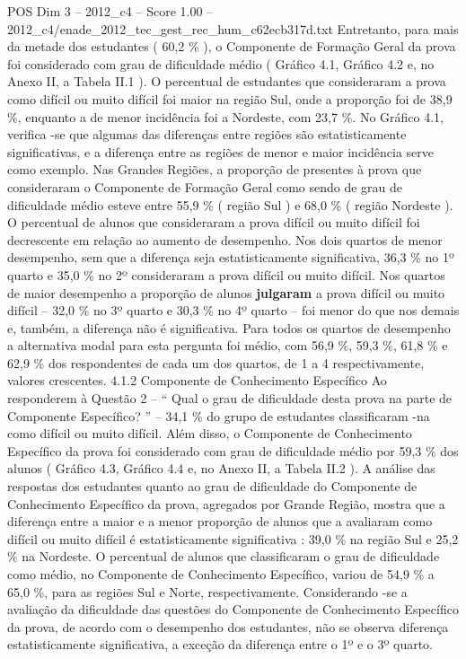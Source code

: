 \begin{textsample}{POS Dim 3 – 2012\_c4 – Score 1.00 – 2012\_c4/enade\_2012\_tec\_gest\_rec\_hum\_c62ecb317d.txt}
Entretanto, para mais da metade dos estudantes ( 60,2 \% ), o Componente de Formação Geral da prova foi considerado com grau de dificuldade médio ( Gráfico 4.1, Gráfico 4.2 e, no Anexo II, a Tabela II.1 ).
O percentual de estudantes que consideraram a prova como difícil ou muito difícil foi maior na região Sul, onde a proporção foi de 38,9 \%, enquanto a de menor incidência foi a Nordeste, com 23,7 \%.
No Gráfico 4.1, verifica -se que algumas das diferenças entre regiões são estatisticamente significativas, e a diferença entre as regiões de menor e maior incidência serve como exemplo.
Nas Grandes Regiões, a proporção de presentes à prova que consideraram o Componente de Formação Geral como sendo de grau de dificuldade médio esteve entre 55,9 \% ( região Sul ) e 68,0 \% ( região Nordeste ).
O percentual de alunos que consideraram a prova difícil ou muito difícil foi decrescente em relação ao aumento de desempenho.
Nos dois quartos de menor desempenho, sem que a diferença seja estatisticamente significativa, 36,3 \% no 1º quarto e 35,0 \% no 2º consideraram a prova difícil ou muito difícil.
Nos quartos de maior desempenho a proporção de alunos \textbf{julgaram} a prova difícil ou muito difícil – 32,0 \% no 3º quarto e 30,3 \% no 4º quarto – foi menor do que nos demais e, também, a diferença não é significativa.
Para todos os quartos de desempenho a alternativa modal para esta pergunta foi médio, com 56,9 \%, 59,3 \%, 61,8 \% e 62,9 \% dos respondentes de cada um dos quartos, de 1 a 4 respectivamente, valores crescentes. 4.1.2 Componente de Conhecimento Específico Ao responderem à Questão 2 – “ Qual o grau de dificuldade desta prova na parte de Componente Específico? ” – 34,1 \% do grupo de estudantes classificaram -na como difícil ou muito difícil.
Além disso, o Componente de Conhecimento Específico da prova foi considerado com grau de dificuldade médio por 59,3 \% dos alunos ( Gráfico 4.3, Gráfico 4.4 e, no Anexo II, a Tabela II.2 ).
A análise das respostas dos estudantes quanto ao grau de dificuldade do Componente de Conhecimento Específico da prova, agregados por Grande Região, mostra que a diferença entre a maior e a menor proporção de alunos que a avaliaram como difícil ou muito difícil é estatisticamente significativa : 39,0 \% na região Sul e 25,2 \% na Nordeste.
O percentual de alunos que classificaram o grau de dificuldade como médio, no Componente de Conhecimento Específico, variou de 54,9 \% a 65,0 \%, para as regiões Sul e Norte, respectivamente.
Considerando -se a avaliação da dificuldade das questões do Componente de Conhecimento Específico da prova, de acordo com o desempenho dos estudantes, não se observa diferença estatisticamente significativa, a exceção da diferença entre o 1º e o 3º quarto.

\end{textsample}
